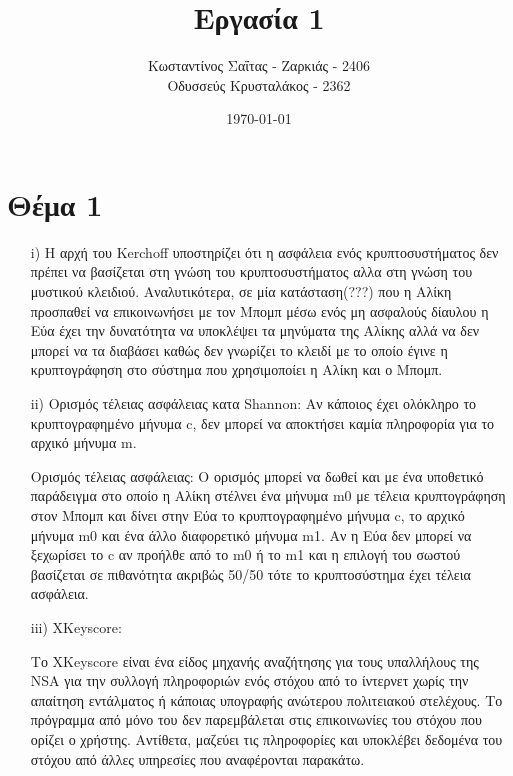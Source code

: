 \documentclass[a4paper, 11pt]{article}
\title{Εργασία 1}
\author{Κωσταντίνος Σαΐτας - Ζαρκιάς - 2406 \\ Οδυσσεύς Κρυσταλάκος - 2362}
\date{\today}
\newcommand{\lt}{\latintext}
\begin{document}
\maketitle

\section*{Θέμα 1}


\begin{itemize}
	\item[{\lt i)}] Η αρχή του {\lt Kerchoff} υποστηρίζει ότι η ασφάλεια ενός κρυπτοσυστήματος δεν πρέπει να βασίζεται στη γνώση του κρυπτοσυστήματος αλλα στη γνώση του μυστικού κλειδιού. Αναλυτικότερα, σε μία κατάσταση(???) που η Αλίκη προσπαθεί να επικοινωνήσει με τον Μπομπ μέσω ενός μη ασφαλούς δίαυλου η Εύα έχει την δυνατότητα να υποκλέψει τα μηνύματα της Αλίκης αλλά να δεν μπορεί να τα διαβάσει καθώς δεν γνωρίζει το κλειδί με το οποίο έγινε η κρυπτογράφηση στο σύστημα που χρησιμοποίει η Αλίκη και ο Μπομπ.
	
	
	
	
	
	
	
	\item[{\lt ii)}] Ορισμός τέλειας ασφάλειας κατα {\lt Shannon}: Αν κάποιος έχει ολόκληρο το κρυπτογραφημένο μήνυμα {\lt c}, δεν μπορεί να αποκτήσει καμία πληροφορία για το αρχικό μήνυμα {\lt m}.
	
					Ορισμός τέλειας ασφάλειας: Ο ορισμός μπορεί να δωθεί και με ένα υποθετικό παράδειγμα στο οποίο η Αλίκη στέλνει ένα μήνυμα {\lt m0} με τέλεια κρυπτογράφηση στον Μπομπ και δίνει στην Εύα το κρυπτογραφημένο μήνυμα {\lt c}, το αρχικό μήνυμα {\lt m0} και ένα άλλο διαφορετικό μήνυμα {\lt m1}. Αν η Εύα δεν μπορεί να ξεχωρίσει το {\lt c} αν προήλθε από το {\lt m0} ή το {\lt m1} και η επιλογή του σωστού βασίζεται σε πιθανότητα ακριβώς 50/50 τότε το κρυπτοσύστημα έχει τέλεια ασφάλεια.
	
	
	
	
	
	
	
	\item[{\lt iii)}] {\lt XKeyscore}:  
	
	Το {\lt XKeyscore} είναι ένα είδος μηχανής αναζήτησης για τους υπαλλήλους της {\lt NSA} για την συλλογή πληροφοριών ενός στόχου από το ίντερνετ χωρίς την απαίτηση εντάλματος ή κάποιας υπογραφής ανώτερου πολιτειακού στελέχους. Το πρόγραμμα από μόνο του δεν παρεμβάλεται στις επικοινωνίες του στόχου που ορίζει ο χρήστης. Αντίθετα, μαζεύει τις πληροφορίες και υποκλέβει δεδομένα του στόχου από άλλες υπηρεσίες που αναφέρονται παρακάτω.



\end{itemize}
\end{document}
